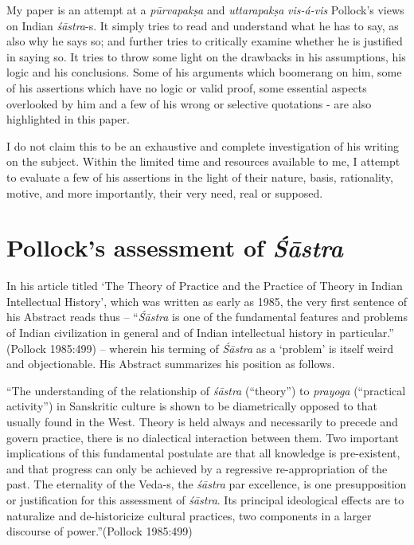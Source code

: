 My paper is an attempt at a {\sl pūrvapakṣa} and {\sl uttarapakṣa} {\em vis-á-vis} Pollock's views on Indian {\sl śāstra}-s. It simply tries to read and understand what he has to say, as also why he says so; and further tries to critically examine whether he is justified in saying so. It tries to throw some light on the drawbacks in his assumptions, his logic and his conclusions. Some of his arguments which boomerang on him, some of his assertions which have no logic or valid proof, some essential aspects overlooked by him and a few of his wrong or selective quotations  - are also highlighted in this paper. 

I do not claim this to be an exhaustive and complete investigation of his writing on the subject. Within the limited time and resources available to me, I attempt to evaluate a few of his assertions in the light of their nature, basis, rationality, motive, and more importantly, their very need, real or supposed.

\vskip -12pt

\section*{Pollock's assessment of {\sl\bfseries Śāstra}}

In his article titled `The Theory of Practice and the Practice of Theory in Indian Intellectual History', which was written as early as 1985, the very first sentence of his Abstract reads thus -- ``{\it Śāstra} is one of the fundamental features and problems of Indian civilization in general and of Indian intellectual history in particular.'' (Pollock 1985:499) -- wherein his terming of {\it Śāstra} as a `problem'  is itself weird and objectionable. His Abstract summarizes his position as follows.
\begin{myquote}
``The understanding of the relationship of {\sl śāstra} (``theory'') to {\sl prayoga}  (``practical activity'') in Sanskritic culture is shown to be diametrically opposed to that usually found in the West. Theory is held always and necessarily to precede and govern practice, there is no dialectical interaction between them. Two important implications of this fundamental postulate are that all knowledge is pre-existent, and that progress can only be achieved by a regressive re-appropriation of the past. The eternality of the Veda-s, the {\sl śāstra} par excellence, is one presupposition or justification for this assessment of {\sl śāstra}. Its principal ideological effects are to naturalize and de-historicize cultural practices, two components in a larger discourse of power.''\hfill (Pollock 1985:499)
\end{myquote}
 

